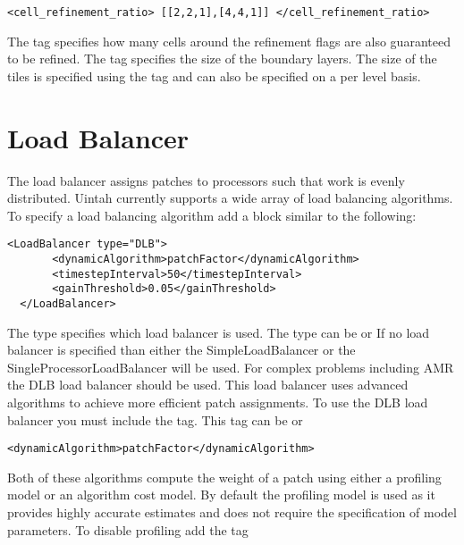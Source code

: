 \begin{Verbatim}[fontsize=\footnotesize]
    <cell_refinement_ratio> [[2,2,1],[4,4,1]] </cell_refinement_ratio>
\end{Verbatim}

The  tag specifies how many cells around
the refinement flags are also guaranteed to be refined.  The
 tag specifies the size of the boundary layers. 
The size of the tiles is specified using the  tag
and can also be specified on a per level basis.

%
\section{Load Balancer}

The load balancer assigns patches to processors such that work is 
evenly distributed.  Uintah currently supports a wide array of 
load balancing algorithms.  To specify a load balancing algorithm 
add a block similar to the following:

\begin{Verbatim}[fontsize=\footnotesize]
  <LoadBalancer type="DLB">
       <dynamicAlgorithm>patchFactor</dynamicAlgorithm>
       <timestepInterval>50</timestepInterval>
       <gainThreshold>0.05</gainThreshold>
  </LoadBalancer>
\end{Verbatim}

The type specifies which load balancer is used.  The type can be
   or
  If no load balancer is specified
than either the SimpleLoadBalancer or the SingleProcessorLoadBalancer
will be used.  For complex problems including AMR the DLB load
balancer should be used.  This load balancer uses advanced algorithms
to achieve more efficient patch assignments.  To use the DLB load
balancer you must include the  tag. This tag can
be  or 

\begin{Verbatim}[fontsize=\footnotesize]
       <dynamicAlgorithm>patchFactor</dynamicAlgorithm>
\end{Verbatim}

Both of these algorithms compute the weight of a patch using either a profiling model 
or an algorithm cost model.  By default  the profiling model is used as it provides 
highly accurate estimates and does not require the specification of model parameters.  
To disable profiling add the tag

